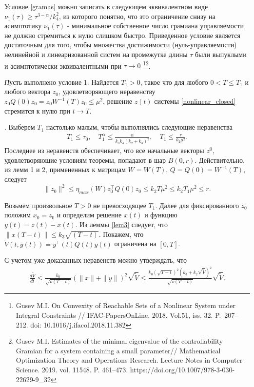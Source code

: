 \documentclass[../main.tex]{subfiles}
\begin{document}
	Условие \eqref{gramas} можно записать в следующем эквивалентном виде $\nu_1(\tau) \geqslant\tau^{3-\alpha}/k_4^2 $, из которого понятно, что это ограничение снизу на асимптотику $\nu_1(\tau)$ - минимальное собственное число грамиана управляемости не должно стремиться к нулю слишком быстро. 
	Приведенное условие является достаточным для того, чтобы множества достижимости (нуль-управляемости) нелинейной и линеаризованной систем на промежутке длины $\tau$ были выпуклыми и асимптотически эквивалентными при $\tau \to 0$ \footnote{Gusev M.I. On Convexity of Reachable Sets of a Nonlinear System under Integral Constraints // IFAC-PapersOnLine. 2018. Vol.51, iss. 32. P.~207--212. doi: 10.1016/j.ifacol.2018.11.382}\footnote{Gusev M.I. Estimates of the minimal eigenvalue of the controllability Gramian for a system containing a small parameter//  Mathematical Optimization Theory and Operations Research. Lecture Notes in Computer Science. 2019. vol. 11548. P. 461--473.  https://doi.org/10.1007/978-3-030-22629-9\_32}.
	\begin{theorem}
	{\textit Пусть выполнено условие 1. Найдется $T_1>0$, такое что для любого $0<T \leqslant T_1$ и любого вектора $z_0$, удовлетворяющего неравенству $z_0 Q(0)z_0=z_0 W^{-1}(T)z_0\leqslant \mu^2$, решение $z(t)$ системы \eqref{nonlinear_closed} стремится к нулю при $t \to T$}. 
	\end{theorem}
	\doc.
	Выберем  $T_1$ настолько малым, чтобы выполнялись следующие неравенства
	\begin{gather}\label{t1}
	T_1 \leqslant \tau_0,\quad T_1^\alpha \leqslant
	\frac{\alpha}{k_0k_4(k_2+k_3)^2}, \quad T_1 \leqslant \frac{r}{k_2\mu^2}.
	\end{gather}
	Последнее из неравенств обеспечивает, что все начальные векторы $z^0$, удовлетворяющие условиям теоремы, попадают в шар $B(0,r)$. Действительно, из лемм 1 и 2, примененных к матрицам $W=W(T)$, $Q=Q(0)=W^{-1}(T)$, следует 
			$$\| z_0 \|^2 \leqslant \eta_{max}(W)z_0^{\top}Q(0)z_0\leqslant k_2T\mu^2 \leqslant k_2T_1\mu^2 \leqslant r.$$  
	  
	Возьмем произвольное $T>0$ не превосходящее $T_1$. Далее для фиксированного $z_0$ положим $x_0=z_0$ и определим решение $x(t)$ и функцию $y(t)=z(t)-x(t)$.  Из леммы \ref{lem3} следует, что  $\|x(T - t) \| \leqslant k_3\sqrt{(T - t)} $.  Покажем, что  $ \widetilde{V}(t,y(t))= y^{\top}(t) Q(t) y(t) $ ограничена на $[0, T]$.
	
	С учетом уже доказанных неравенств можно утверждать, что
	\begin{gather}\label{dV2}
		\frac{d\widetilde{V}}{dt} \leqslant \frac{k_0}{\sqrt{\nu(T - t)}} (\|x \| + \|y \|)^2 \sqrt{\widetilde{V}} \leqslant \frac{k_0 (\sqrt{T - t})^2 (k_3 + k_2 \sqrt{\widetilde{V}})^2 }{\sqrt{\nu(T - t)}} \sqrt{\widetilde{V}}.
	\end{gather}
	
\end{document}

